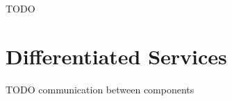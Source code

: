 \ifdraft TODO

\chapter{Differentiated Services}
\label{cha:diffserv}

TODO communication between components

\fi



